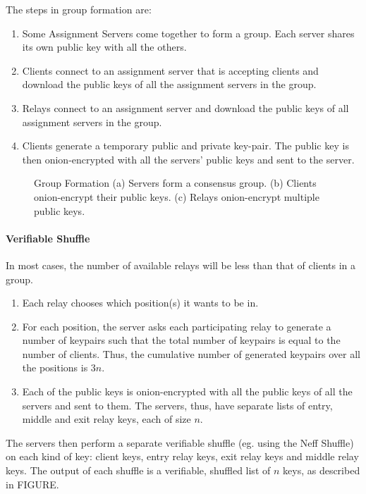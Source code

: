 The steps in group formation are: 
\begin{enumerate} 
\item Some Assignment Servers come together to form a group. Each server shares 
its own public key with all the others. 
\item Clients connect to an assignment server that is accepting clients and 
download the public keys of all the assignment servers in the group.
\item Relays connect to an assignment server and download the public
keys of all assignment servers in the group. 
\item Clients generate a temporary public and private key-pair. The public key 
is then onion-encrypted with all the servers' public keys and sent to the server.
\end{enumerate}

\begin{figure}[htbp]
  \centering
  \caption{Group Formation (a) Servers form a consensus group. 
    (b) Clients onion-encrypt their public keys. 
    (c) Relays onion-encrypt multiple public keys.}
  \label{rfidtag_testing}
\end{figure}

\paragraph{Verifiable Shuffle}

In most cases, the number of available relays will be less than that of clients 
in a group. 
\begin{enumerate} 
\item Each relay chooses which position(s) it wants to be in.
\item For each position, the server asks each participating relay to generate a 
number of keypairs
such that the total number of keypairs is equal to the number of clients. Thus,
the cumulative number of generated keypairs over all the positions is $3n$.
\item Each of the public keys is onion-encrypted with all the public keys of all the 
servers and sent to them. The servers, thus, have separate lists of entry, middle
and exit relay keys, each of size $n$.
\end{enumerate}

The servers then perform a separate verifiable shuffle (eg. using the Neff
Shuffle\cite{neff2001verifiable}) on each kind of key: client keys, entry relay
keys, exit relay keys and middle relay keys. The output of each shuffle is a
verifiable, shuffled list of $n$ keys, as described in FIGURE. 

